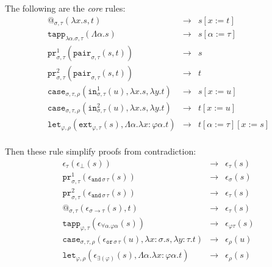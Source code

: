 \documentclass[a4paper,UKenglish,cleveref,autoref,numberwithinsect]{lipics-v2019}
\theoremstyle{definition}
\newcommand{\arrtype}{\rightarrow}
\newcommand{\quant}[2]{\forall #1.#2}
\newcommand{\abs}[2]{\lambda #1.#2}
\newcommand{\tabs}[2]{\Lambda #1.#2}
\newcommand{\red}{\longrightarrow}
\newcommand{\proj}{\mathtt{pr}}
\begin{document}
The following are the \emph{core} rules:
\[
\begin{array}{rcl}
@_{\sigma,\tau}(\abs{x}{s},t) & \red & s[x:=t] \\
\mathtt{tapp}_{\abs{\alpha}{\sigma},\tau}(\tabs{\alpha}{s}) & \red &
  s[\alpha:=\tau] \\
\proj^1_{\sigma,\tau}(\mathtt{pair}_{\sigma,\tau}(s,t)) & \red & s \\
\proj^2_{\sigma,\tau}(\mathtt{pair}_{\sigma,\tau}(s,t)) & \red & t \\
\mathtt{case}_{\sigma,\tau,\rho}(\mathtt{in}^1_{\sigma,\tau}(u),
  \abs{x}{s},\abs{y}{t}) & \red & s[x:=u] \\
\mathtt{case}_{\sigma,\tau,\rho}(\mathtt{in}^2_{\sigma,\tau}(u),
  \abs{x}{s},\abs{y}{t}) & \red & t[x:=u] \\
\mathtt{let}_{\varphi,\rho}(\mathtt{ext}_{\varphi,\tau}(s),\tabs{\alpha}{\abs{x:\varphi \alpha}{t}}) & \red & t[\alpha:=\tau][x:=s] \\
\end{array}
\]

Then these rule simplify proofs from contradiction:
\[
\begin{array}{rclrcl}
\epsilon_\tau(\epsilon_\bot(s)) & \red & \epsilon_\tau(s) \\
\proj^1_{\sigma,\tau}(\epsilon_{\mathtt{and}\,\sigma\,\tau}(s)) & \red &
  \epsilon_\sigma(s) \\
\proj^2_{\sigma,\tau}(\epsilon_{\mathtt{and}\,\sigma\,\tau}(s)) & \red &
  \epsilon_\tau(s) \\
@_{\sigma,\tau}(\epsilon_{\sigma \arrtype \tau}(s),t) & \red &
  \epsilon_\tau(s) \\
\mathtt{tapp}_{\varphi,\tau}(
  \epsilon_{\quant{\alpha}{\varphi\alpha}}(s)) & \red &
  \epsilon_{\varphi\tau}(s) \\
\mathtt{case}_{\sigma,\tau,\rho}(\epsilon_{\mathtt{or}\,\sigma\,\tau}(
  u),\abs{x:\sigma}{s},\abs{y:\tau}{t}) & \red & \epsilon_\rho(u) \\
\mathtt{let}_{\varphi,\rho}(\epsilon_{\exists(\varphi)}(s),\tabs{\alpha}{\abs{x:\varphi\alpha}{t}}) & \red &
  \epsilon_\rho(s) \\
\end{array}
\]
\end{document}
